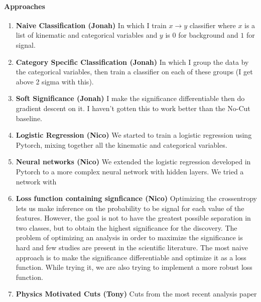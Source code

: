 \documentclass[11pt]{article}
\begin{document}
\paragraph{Approaches}
\begin{enumerate}
\item {\bf Naive Classification (Jonah)}
In which I train $x \rightarrow y$ classifier where $x$ is a list of kinematic and categorical variables and $y$ is $0$ for background and $1$ for signal.

\item {\bf Category Specific Classification (Jonah)}
In which I group the data by the categorical variables, then train a classifier on each of these groups (I get above 2 sigma with this).

\item {\bf Soft Significance (Jonah)}
I make the significance differentiable then do gradient descent on it. I haven't gotten this to work better than the No-Cut baseline.

\item {\bf Logistic Regression (Nico)}
We started to train a logistic regression using Pytorch, mixing together all the kinematic and categorical variables.

\item {\bf Neural networks (Nico)}
We extended the logistic regression developed in Pytorch to a more complex neural network with hidden layers. We tried a network with 

\item {\bf Loss function containing signficance (Nico)}
Optimizing the crossentropy lets us make inference on the probability to be signal for each value of the features. However, the goal is not to have the greatest possible separation in two classes, but to obtain the highest significance for the discovery. The problem of optimizing an analysis in order to maximize the significance is hard and few studies are present in the scientific literature. The most naive approach is to make the significance differentiable and optimize it as a loss function. While trying it, we are also trying to implement a more robust loss function.

\item {\bf Physics Motivated Cuts (Tony)}
Cuts from the most recent analysis paper

\end{enumerate}
\end{document}
